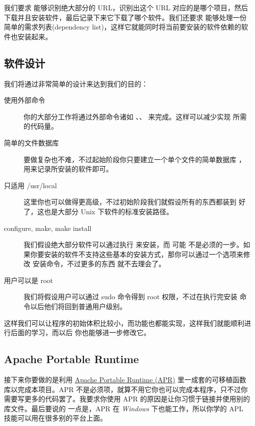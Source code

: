 我们要求  能够识别绝大部分的 URL，识别出这个 URL 对应的是哪个项目，然后
下载并且安装软件，最后记录下来它下载了哪个软件。我们还要求  能够处理一份
简单的需求列表(dependency list)，这样它就能同时将当前要安装的软件依赖的软件也安装起来。

\subsection{软件设计}

我们将通过非常简单的设计来达到我们的目的：

\begin{description}
\item[使用外部命令] 你的大部分工作将通过外部命令诸如 、、
    来完成。这样可以减少实现  所需的代码量。
\item[简单的文件数据库] 要做复杂也不难，不过起始阶段你只要建立一个单个文件的简单数据库
    ，用来记录所安装的软件即可。
\item[只适用 /usr/local] 这里你也可以做得更高级，不过初始阶段我们就假设所有的东西都装到
     好了，这也是大部分 Unix 下软件的标准安装路径。
\item[configure, make, make install] 我们假设绝大部分软件可以通过执行 
     来安装，而  可能
    不是必须的一步。如果你要安装的软件不支持这些基本的安装方式，那你可以通过一个选项来修改
    安装命令，不过更多的东西  就不去理会了。
\item[用户可以是 root] 我们将假设用户可以通过 sudo 命令得到 root 权限，不过在执行完安装
    命令以后他们将回到普通用户级别。
\end{description}

这样我们可以让程序的初始体积比较小，而功能也都能实现，这样我们就能顺利进行后面的学习，而以后
你也能够进一步修改它。

\subsection{Apache Portable Runtime}

接下来你要做的是利用 \href{http://apr.apache.org/}{Apache Portable Runtime (APR)} 
里一成套的可移植函数库以完成本项目。APR 不是必须项，就算不用它你也可以完成本程序，只不过你
需要写更多的代码罢了。我要求你使用 APR 的原因是让你习惯于链接并使用别的库文件。最后要说的
一点是，APR 在 \emph{Windows} 下也能工作，所以你学的 APL 技能可以用在很多别的平台上面。

